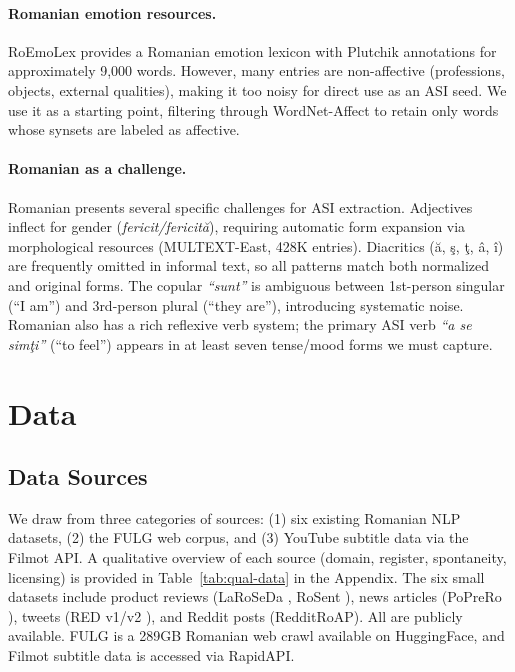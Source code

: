 \documentclass[11pt]{article}
\begin{document}
\paragraph{Romanian emotion resources.} RoEmoLex \cite{roemolex2019} provides a Romanian emotion lexicon with Plutchik \cite{plutchik1980} annotations for approximately 9,000 words. However, many entries are non-affective (professions, objects, external qualities), making it too noisy for direct use as an ASI seed. We use it as a starting point, filtering through WordNet-Affect to retain only words whose synsets are labeled as affective.

\paragraph{Romanian as a challenge.} Romanian presents several specific challenges for ASI extraction. Adjectives inflect for gender (\textit{fericit/fericit\u{a}}), requiring automatic form expansion via morphological resources (MULTEXT-East, 428K entries). Diacritics (\u{a}, \c{s}, \c{t}, \^{a}, \^{i}) are frequently omitted in informal text, so all patterns match both normalized and original forms. The copular \textit{``sunt''} is ambiguous between 1st-person singular (``I am'') and 3rd-person plural (``they are''), introducing systematic noise. Romanian also has a rich reflexive verb system; the primary ASI verb \textit{``a se sim\c{t}i''} (``to feel'') appears in at least seven tense/mood forms we must capture.


\section{Data}

\subsection{Data Sources}

We draw from three categories of sources: (1) six existing Romanian NLP datasets, (2) the FULG web corpus, and (3) YouTube subtitle data via the Filmot API. A qualitative overview of each source (domain, register, spontaneity, licensing) is provided in Table~\ref{tab:qual-data} in the Appendix. The six small datasets include product reviews (LaRoSeDa \cite{laroseda2021}, RoSent \cite{rosent2022}), news articles (PoPreRo \cite{poprero2022}), tweets (RED v1/v2 \cite{red2022}), and Reddit posts (RedditRoAP). All are publicly available. FULG \cite{fulg2024} is a 289GB Romanian web crawl available on HuggingFace, and Filmot subtitle data is accessed via RapidAPI.
\end{document}
